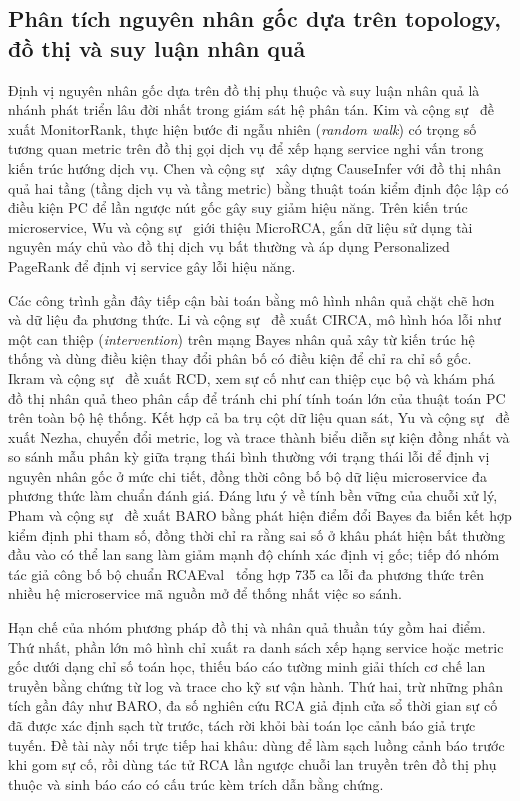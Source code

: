 \subsection{Phân tích nguyên nhân gốc dựa trên topology, đồ thị và suy luận nhân quả}
\label{sec:ch3-rca-graph}

Định vị nguyên nhân gốc dựa trên đồ thị phụ thuộc và suy luận nhân quả là nhánh phát triển lâu đời nhất trong giám sát hệ phân tán. Kim và cộng sự~\cite{kim2013monitorrank} đề xuất MonitorRank, thực hiện bước đi ngẫu nhiên (\emph{random walk}) có trọng số tương quan metric trên đồ thị gọi dịch vụ để xếp hạng service nghi vấn trong kiến trúc hướng dịch vụ. Chen và cộng sự~\cite{chen2014causeinfer} xây dựng CauseInfer với đồ thị nhân quả hai tầng (tầng dịch vụ và tầng metric) bằng thuật toán kiểm định độc lập có điều kiện PC để lần ngược nút gốc gây suy giảm hiệu năng. Trên kiến trúc microservice, Wu và cộng sự~\cite{wu2020microrca} giới thiệu MicroRCA, gắn dữ liệu sử dụng tài nguyên máy chủ vào đồ thị dịch vụ bất thường và áp dụng Personalized PageRank để định vị service gây lỗi hiệu năng.

Các công trình gần đây tiếp cận bài toán bằng mô hình nhân quả chặt chẽ hơn và dữ liệu đa phương thức. Li và cộng sự~\cite{li2022circa} đề xuất CIRCA, mô hình hóa lỗi như một can thiệp (\emph{intervention}) trên mạng Bayes nhân quả xây từ kiến trúc hệ thống và dùng điều kiện thay đổi phân bố có điều kiện để chỉ ra chỉ số gốc. Ikram và cộng sự~\cite{ikram2022rcd} đề xuất RCD, xem sự cố như can thiệp cục bộ và khám phá đồ thị nhân quả theo phân cấp để tránh chi phí tính toán lớn của thuật toán PC trên toàn bộ hệ thống. Kết hợp cả ba trụ cột dữ liệu quan sát, Yu và cộng sự~\cite{yu2023nezha} đề xuất Nezha, chuyển đổi metric, log và trace thành biểu diễn sự kiện đồng nhất và so sánh mẫu phân kỳ giữa trạng thái bình thường với trạng thái lỗi để định vị nguyên nhân gốc ở mức chi tiết, đồng thời công bố bộ dữ liệu microservice đa phương thức làm chuẩn đánh giá. Đáng lưu ý về tính bền vững của chuỗi xử lý, Pham và cộng sự~\cite{pham2024baro} đề xuất BARO bằng phát hiện điểm đổi Bayes đa biến kết hợp kiểm định phi tham số, đồng thời chỉ ra rằng sai số ở khâu phát hiện bất thường đầu vào có thể lan sang làm giảm mạnh độ chính xác định vị gốc; tiếp đó nhóm tác giả công bố bộ chuẩn RCAEval~\cite{pham2025rcaeval} tổng hợp 735 ca lỗi đa phương thức trên nhiều hệ microservice mã nguồn mở để thống nhất việc so sánh.

Hạn chế của nhóm phương pháp đồ thị và nhân quả thuần túy gồm hai điểm. Thứ nhất, phần lớn mô hình chỉ xuất ra danh sách xếp hạng service hoặc metric gốc dưới dạng chỉ số toán học, thiếu báo cáo tường minh giải thích cơ chế lan truyền bằng chứng từ log và trace cho kỹ sư vận hành. Thứ hai, trừ những phân tích gần đây như BARO, đa số nghiên cứu RCA giả định cửa sổ thời gian sự cố đã được xác định sạch từ trước, tách rời khỏi bài toán lọc cảnh báo giả trực tuyến. Đề tài này nối trực tiếp hai khâu: dùng \CTAV{} để làm sạch luồng cảnh báo trước khi gom sự cố, rồi dùng tác tử RCA lần ngược chuỗi lan truyền trên đồ thị phụ thuộc và sinh báo cáo có cấu trúc kèm trích dẫn bằng chứng.

